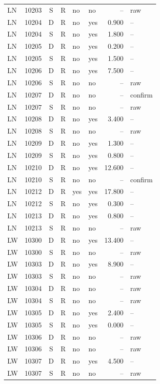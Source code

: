 \begin{longtable}{@{}llclllrl@{}}
LN & 10203 & S & R & no & no & -- & raw\\
LN & 10204 & D & R & no & yes & 0.900 & --\\
LN & 10204 & S & R & no & yes & 1.800 & --\\
LN & 10205 & D & R & no & yes & 0.200 & --\\
LN & 10205 & S & R & no & yes & 1.500 & --\\
LN & 10206 & D & R & no & yes & 7.500 & --\\
LN & 10206 & S & R & no & no & -- & raw\\
LN & 10207 & D & R & no & no & -- & confirm\\
LN & 10207 & S & R & no & no & -- & raw\\
LN & 10208 & D & R & no & yes & 3.400 & --\\
LN & 10208 & S & R & no & no & -- & raw\\
LN & 10209 & D & R & no & yes & 1.300 & --\\
LN & 10209 & S & R & no & yes & 0.800 & --\\
LN & 10210 & D & R & no & yes & 12.600 & --\\
LN & 10210 & S & R & no & no & -- & confirm\\
LN & 10212 & D & R & yes & yes & 17.800 & --\\
LN & 10212 & S & R & no & yes & 0.300 & --\\
LN & 10213 & D & R & no & yes & 0.800 & --\\
LN & 10213 & S & R & no & no & -- & raw\\
LW & 10300 & D & R & no & yes & 13.400 & --\\
LW & 10300 & S & R & no & no & -- & raw\\
LW & 10303 & D & R & no & yes & 8.900 & --\\
LW & 10303 & S & R & no & no & -- & raw\\
LW & 10304 & D & R & no & no & -- & raw\\
LW & 10304 & S & R & no & no & -- & raw\\
LW & 10305 & D & R & no & yes & 2.400 & --\\
LW & 10305 & S & R & no & yes & 0.000 & --\\
LW & 10306 & D & R & no & no & -- & raw\\
LW & 10306 & S & R & no & no & -- & raw\\
LW & 10307 & D & R & no & yes & 4.500 & --\\
LW & 10307 & S & R & no & no & -- & raw\\

\end{longtable}
